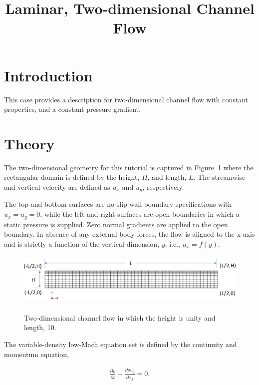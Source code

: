 \documentclass{article}
\title{Laminar, Two-dimensional Channel Flow}
\date{}
\begin{document}
\maketitle

\section{Introduction}
This case provides a description for two-dimensional channel flow
with constant properties, and a constant pressure gradient.

\section{Theory}
The two-dimensional geometry for this tutorial is captured in 
Figure~\ref{fig:geom} where the rectangular domain is defined by the 
height, $H$, and length, $L$. The streamwise and vertical velocity are 
defined as $u_x$ and $u_y$, respectively.

The top and bottom surfaces are no-slip wall boundary specifications with $u_x = u_y = 0$,
while the left and right surfaces are open boundaries in which a static 
pressure is supplied. Zero normal gradients are applied to the open boundary. In 
absence of any external body forces, the flow is 
aligned to the x-axis and is strictly a function of the vertical-dimension, $y$,
i.e., $u_x = f(y)$.

\begin{figure}[!htbp]
  \centering
  {
   \includegraphics[height=1.0in]{images/2d_quad4_channel_geom.pdf}
  }
  \caption{Two-dimensional channel flow in which the height is unity and length, 10.}
  \label{fig:geom}
\end{figure}

The variable-density low-Mach equation set is defined by the continuity and momentum equation,

\begin{align}
  \frac {\partial \rho }{\partial t} + \frac{ \partial \rho u_j}{\partial x_j} = 0.
\label{eq:contEq}
\end{align} 
\end{document}
